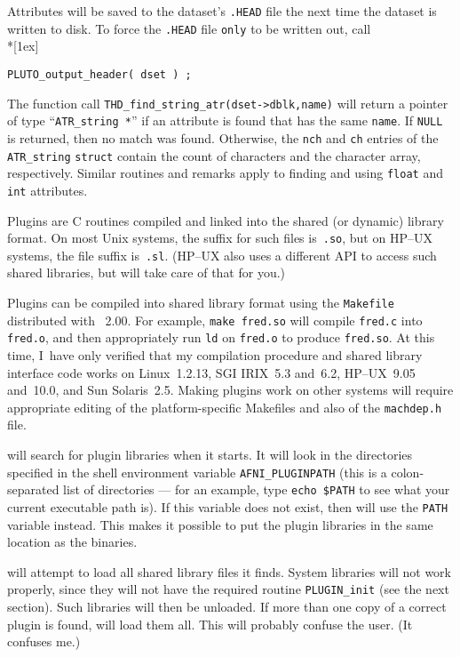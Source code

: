     Attributes will be saved to the dataset's {\tt .HEAD} file the next time
    the dataset is written to disk.  To force the {\tt .HEAD} file {\tt only}
    to be written out, call\\*[1ex]
\centerline{\tt PLUTO\_output\_header( dset ) ;}

    The function call {\tt THD\_find\_string\_atr(dset->dblk,name)} will return
    a pointer of type ``{\tt ATR\_string~*}'' if an attribute is found that has the
    same {\tt name}.  If {\tt NULL} is returned, then no match was found.  Otherwise,
    the {\tt nch} and {\tt ch} entries of the {\tt ATR\_string} {\tt struct} contain
    the count of characters and the character array, respectively.  Similar
    routines and remarks apply to finding and using {\tt float} and {\tt int} attributes.

\label{Libraries}
Plugins are C routines compiled and linked into the shared (or dynamic)
library format.  On most Unix systems, the suffix for such files is~{\tt .so},
but on HP--UX systems, the file suffix is~{\tt .sl}.  (HP--UX also uses
a different API to access such shared libraries, but \afnit will take
care of that for you.)

Plugins can be compiled into shared library format using the
{\tt Makefile} distributed with \mcwafni~2.00.  For example,
{\tt make fred.so}
will compile {\tt fred.c} into {\tt fred.o}, and then appropriately
run {\tt ld} on {\tt fred.o} to produce {\tt fred.so}.  At this time,
I~have only verified that my compilation procedure and shared library
interface code works on
Linux~1.2.13, SGI IRIX~5.3 and~6.2, HP--UX~9.05 and~10.0, and Sun Solaris~2.5.
Making
plugins work on
other systems will require appropriate editing of
the platform-specific Makefiles and also of the {\tt machdep.h} file.

\afnit will search for plugin libraries when it starts.  It will
look in the directories specified in the shell environment variable
{\tt AFNI\_PLUGINPATH} (this is a colon-separated list of directories
--- for an example, type {\tt echo \$PATH} to see what your current executable
path is).
If this variable does not exist, then \afnit will use the
{\tt PATH} variable instead.  This makes it possible to put the
plugin libraries in the same location as the \afnit binaries.

\afnit will attempt to load all shared library files it finds.
System libraries will not work properly, since they will not have the
required routine {\tt PLUGIN\_init} (see the next section).  Such libraries will then be
unloaded.  If more than one copy of a correct plugin is found, \afnit
will load them all.  This will probably confuse the user. (It confuses me.)

